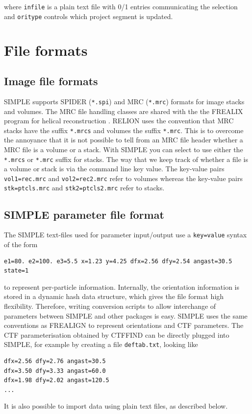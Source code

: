 \documentclass[a4paper,11pt]{article}
\begin{document}
where \texttt{infile} is a plain text file with 0/1 entries communicating the selection and \texttt{oritype} controls which project segment is updated. 

\section{File formats}

\subsection{Image file formats}
SIMPLE supports SPIDER (\texttt{*.spi}) and MRC (\texttt{*.mrc}) formats for image stacks and volumes. The MRC file handling classes are shared with the the FREALIX program for helical reconstruction \citep{Rohou:2014aa}. RELION \citep{Scheres:2012aa} uses the convention that MRC stacks have the suffix \texttt{*.mrcs} and volumes the suffix \texttt{*.mrc}. This is to overcome the annoyance that it is not possible to tell from an MRC file header whether a MRC file is a volume or a stack. With SIMPLE you can select to use either the \texttt{*.mrcs} or \texttt{*.mrc} suffix for stacks. The way that we keep track of whether a file is a volume or stack is via the command line key value. The key-value pairs \texttt{vol1=rec.mrc} and \texttt{vol2=rec2.mrc} refer to volumes whereas the key-value pairs \texttt{stk=ptcls.mrc} and \texttt{stk2=ptcls2.mrc} refer to stacks.

\subsection{SIMPLE parameter file format}
The SIMPLE text-files used for parameter input/output use a \texttt{key=value} syntax of the form
\begin{Verbatim}[commandchars=+\[\],fontsize=\small,breaklines=true]
e1=80. e2=100. e3=5.5 x=1.23 y=4.25 dfx=2.56 dfy=2.54 angast=30.5 state=1
\end{Verbatim}
to represent per-particle information. Internally, the orientation information is stored in a dynamic hash data structure, which gives the file format high flexibility. Therefore, writing conversion scripts to allow interchange of parameters between SIMPLE and other packages is easy. SIMPLE uses the same conventions as FREALIGN \citep{Grigorieff:2007aa} to represent orientations and CTF parameters. The CTF parameterisation obtained by CTFFIND \citep{Mindell:2003aa} can be directly plugged into SIMPLE, for example by creating a file \texttt{deftab.txt}, looking like
\begin{Verbatim}[commandchars=+\[\],fontsize=\small,breaklines=true]
dfx=2.56 dfy=2.76 angast=30.5
dfx=3.50 dfy=3.33 angast=60.0
dfx=1.98 dfy=2.02 angast=120.5
...
\end{Verbatim}
It is also possible to import data using plain text files, as described below.
\end{document}
